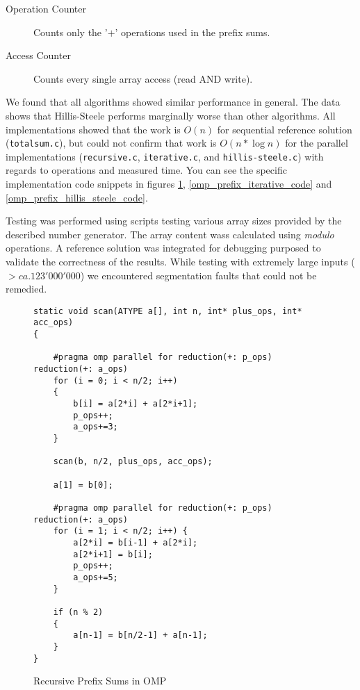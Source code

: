 \documentclass[11pt]{article}
\begin{document}
\begin{description}
\item[Operation Counter] Counts only the '$+$' operations used in the prefix sums. 
\item[Access Counter] Counts every single array access (read AND write).
\end{description}

We found that all algorithms showed similar performance in general. The data shows that Hillis-Steele performs marginally worse than other algorithms. All implementations showed that the work is $O(n)$ for sequential reference solution (\verb=totalsum.c=), but could not confirm that work is $O(n * \log n)$ for the parallel implementations (\verb=recursive.c=, \verb=iterative.c=, and \verb=hillis-steele.c=) with regards to operations and measured time. You can see the specific implementation code snippets in figures \ref{omp_prefix_recursive_code}, \ref{omp_prefix_iterative_code} and \ref{omp_prefix_hillis_steele_code}.

Testing was performed using scripts testing various array sizes provided by the described number generator. The array content wass calculated using \emph{modulo} operations. A reference solution was integrated for debugging purposed to validate the correctness of the results. While testing with extremely large inputs ($> ca. 123'000'000$) we encountered segmentation faults that could not be remedied.

\begin{figure}[h]
\label{omp_prefix_recursive_code}
\caption{Recursive Prefix Sums in OMP}
\begin{lstlisting}
static void scan(ATYPE a[], int n, int* plus_ops, int* acc_ops)
{

	#pragma omp parallel for reduction(+: p_ops) reduction(+: a_ops)
	for (i = 0; i < n/2; i++) 
	{
		b[i] = a[2*i] + a[2*i+1];
		p_ops++;
		a_ops+=3;
	}

	scan(b, n/2, plus_ops, acc_ops);

	a[1] = b[0];

	#pragma omp parallel for reduction(+: p_ops) reduction(+: a_ops)
	for (i = 1; i < n/2; i++) {
		a[2*i] = b[i-1] + a[2*i];
		a[2*i+1] = b[i];
		p_ops++;
		a_ops+=5;
	}

	if (n % 2)
	{
		a[n-1] = b[n/2-1] + a[n-1];
	}
}
\end{lstlisting}
\end{figure}
\end{document}
